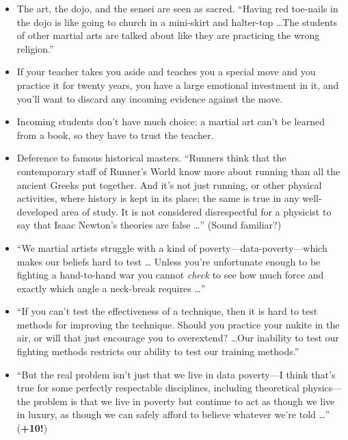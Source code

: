 \begin{itemize}
\item {
 The art, the dojo, and the sensei are seen as sacred.
``Having red toe-nails in the dojo is like going to
church in a mini-skirt and halter-top \ldots The students of other
martial arts are talked about like they are practicing the wrong
religion.''}

\item {
 If your teacher takes you aside and teaches you a special move and
you practice it for twenty years, you have a large emotional investment
in it, and you'll want to discard any incoming evidence
against the move.}

\item {
 Incoming students don't have much choice: a
martial art can't be learned from a book, so they have
to trust the teacher.}

\item {
 Deference to famous historical masters. ``Runners
think that the contemporary staff of Runner's World
know more about running than all the ancient Greeks put together. And
it's not just running, or other physical activities,
where history is kept in its place; the same is true in any
well-developed area of study. It is not considered disrespectful for a
physicist to say that Isaac Newton's theories are false
\ldots'' (Sound familiar?)}

\item {
 ``We martial artists struggle with a kind of
poverty---data-poverty---which makes our beliefs hard to test \ldots
Unless you're unfortunate enough to be fighting a
hand-to-hand war you cannot \textit{check} to see how much force and
exactly which angle a neck-break requires \ldots''}

\item {
 ``If you can't test the
effectiveness of a technique, then it is hard to test methods for
improving the technique. Should you practice your nukite in the air, or
will that just encourage you to overextend? \ldots Our inability to test
our fighting methods restricts our ability to test our training
methods.''}

\item {
 ``But the real problem isn't just
that we live in data poverty---I think that's true for
some perfectly respectable disciplines, including theoretical
physics---the problem is that we live in poverty but continue to act as
though we live in luxury, as though we can safely afford to believe
whatever we're told \ldots''
(\textbf{+10!})}
\end{itemize}

